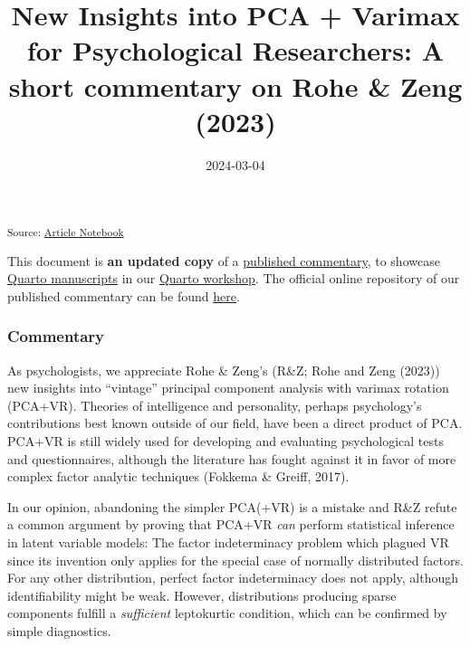 \documentclass[
  jou,
  longtable,
  colorlinks=true,linkcolor=blue,citecolor=blue,urlcolor=blue]{apa7}
\title{New Insights into PCA + Varimax for Psychological Researchers: A
short commentary on Rohe \& Zeng (2023)}
\date{2024-03-04}
\begin{document}
\maketitle
\setcounter{secnumdepth}{-\maxdimen} %

\setlength\LTleft{0pt}


\textsubscript{Source:
\href{https://FlorianPargent.github.io/myquartomanuscript/index-preview.html}{Article
Notebook}}

\begin{tcolorbox}[enhanced jigsaw, arc=.35mm, leftrule=.75mm, colframe=quarto-callout-important-color-frame, colback=white, toptitle=1mm, rightrule=.15mm, colbacktitle=quarto-callout-important-color!10!white, breakable, title=\textcolor{quarto-callout-important-color}{\faExclamation}\hspace{0.5em}{Important}, opacitybacktitle=0.6, coltitle=black, titlerule=0mm, opacityback=0, toprule=.15mm, bottomtitle=1mm, bottomrule=.15mm, left=2mm]

This document is \textbf{an updated copy} of a
\href{https://doi.org/10.1093/jrsssb/qkad054}{published commentary}, to
showcase \href{https://quarto.org/docs/manuscripts/}{Quarto manuscripts}
in our \href{https://florianpargent.github.io/Quarto_LMU_OSC/}{Quarto
workshop}. The official online repository of our published commentary
can be found \href{https://osf.io/5symf/}{here}.

\end{tcolorbox}

\subsubsection{Commentary}\label{commentary}

As psychologists, we appreciate Rohe \& Zeng's (R\&Z; Rohe and Zeng
(2023)) new insights into ``vintage'' principal component analysis with
varimax rotation (PCA+VR). Theories of intelligence and personality,
perhaps psychology's contributions best known outside of our field, have
been a direct product of PCA. PCA+VR is still widely used for developing
and evaluating psychological tests and questionnaires, although the
literature has fought against it in favor of more complex factor
analytic techniques (Fokkema \& Greiff, 2017).

In our opinion, abandoning the simpler PCA(+VR) is a mistake and R\&Z
refute a common argument by proving that PCA+VR \emph{can} perform
statistical inference in latent variable models: The factor
indeterminacy problem which plagued VR since its invention only applies
for the special case of normally distributed factors. For any other
distribution, perfect factor indeterminacy does not apply, although
identifiability might be weak. However, distributions producing sparse
components fulfill a \emph{sufficient} leptokurtic condition, which can
be confirmed by simple diagnostics.
\end{document}
